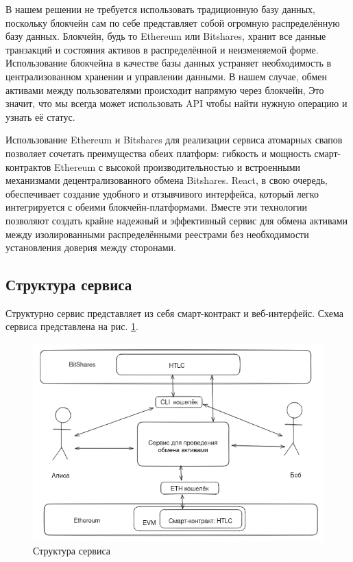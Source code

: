 В нашем решении не требуется использовать традиционную базу данных, поскольку блокчейн сам по себе представляет собой огромную распределённую базу данных. Блокчейн, будь то Ethereum или Bitshares, хранит все данные транзакций и состояния активов в распределённой и неизменяемой форме. Использование блокчейна в качестве базы данных устраняет необходимость в централизованном хранении и управлении данными. В нашем случае, обмен активами между пользователями происходит напрямую через блокчейн, Это значит, что мы всегда может использовать API чтобы найти нужную операцию и узнать её статус.

Использование Ethereum и Bitshares для реализации сервиса атомарных свапов позволяет сочетать преимущества обеих платформ: гибкость и мощность смарт-контрактов Ethereum с высокой производительностью и встроенными механизмами децентрализованного обмена Bitshares. React, в свою очередь, обеспечивает создание удобного и отзывчивого интерфейса, который легко интегрируется с обеими блокчейн-платформами. Вместе эти технологии позволяют создать крайне надежный и эффективный сервис для обмена активами между изолированными распределёнными реестрами без необходимости установления доверия между сторонами.

\subsection{Структура сервиса}

Структурно сервис представляет из себя смарт-контракт и веб-интерфейс. Схема сервиса представлена на рис. \ref{pic:architecture}.

\begin{figure}[H]
\centering
\includegraphics[scale=0.65]{res/architecture}
\caption{Структура сервиса}
\label{pic:architecture}
\end{figure}

